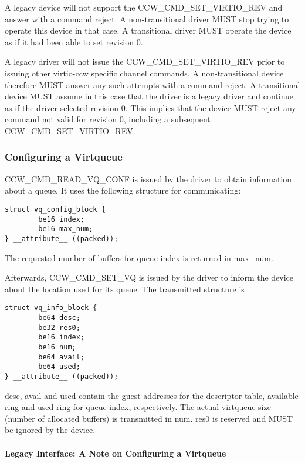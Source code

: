 A legacy device will not support the CCW_CMD_SET_VIRTIO_REV and answer
with a command reject. A non-transitional driver MUST stop trying to
operate this device in that case. A transitional driver MUST operate
the device as if it had been able to set revision 0.

A legacy driver will not issue the CCW_CMD_SET_VIRTIO_REV prior to
issuing other virtio-ccw specific channel commands. A non-transitional
device therefore MUST answer any such attempts with a command reject.
A transitional device MUST assume in this case that the driver is a
legacy driver and continue as if the driver selected revision 0. This
implies that the device MUST reject any command not valid for revision
0, including a subsequent CCW_CMD_SET_VIRTIO_REV.

\subsubsection{Configuring a Virtqueue}\label{sec:Virtio Transport Options / Virtio over channel I/O / Device Initialization / Configuring a Virtqueue}

CCW_CMD_READ_VQ_CONF is issued by the driver to obtain information
about a queue. It uses the following structure for communicating:

\begin{lstlisting}
struct vq_config_block {
        be16 index;
        be16 max_num;
} __attribute__ ((packed));
\end{lstlisting}

The requested number of buffers for queue index is returned in
max_num.

Afterwards, CCW_CMD_SET_VQ is issued by the driver to inform the
device about the location used for its queue. The transmitted
structure is

\begin{lstlisting}
struct vq_info_block {
        be64 desc;
        be32 res0;
        be16 index;
        be16 num;
        be64 avail;
        be64 used;
} __attribute__ ((packed));
\end{lstlisting}

desc, avail and used contain the guest addresses for the descriptor table,
available ring and used ring for queue index, respectively. The actual
virtqueue size (number of allocated buffers) is transmitted in num.
res0 is reserved and MUST be ignored by the device.

\paragraph{Legacy Interface: A Note on Configuring a Virtqueue}\label{sec:Virtio Transport Options / Virtio over channel I/O / Device Initialization / Configuring a Virtqueue / Legacy Interface: A Note on Configuring a Virtqueue}


